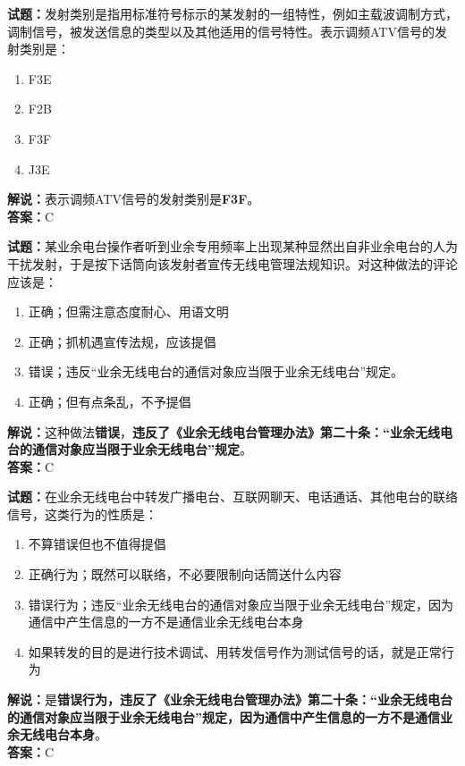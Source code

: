\documentclass{ctexbook}
\begin{document}
\vspace{\baselineskip}

\noindent\textbf{试题：}发射类别是指用标准符号标示的某发射的一组特性，例如主载波调制方式，调制信号，被发送信息的类型以及其他适用的信号特性。表示调频ATV信号的发射类别是：
\begin{enumerate}[leftmargin=3em]
  \item F3E
  \item F2B
  \item F3F
  \item J3E
\end{enumerate}
\noindent\textbf{解说：}表示调频ATV信号的发射类别是\textbf{F3F}。\\\noindent\textbf{答案：}C

\vspace{\baselineskip}

\noindent\textbf{试题：}某业余电台操作者听到业余专用频率上出现某种显然出自非业余电台的人为干扰发射，于是按下话筒向该发射者宣传无线电管理法规知识。对这种做法的评论应该是：
\begin{enumerate}[leftmargin=3em]
  \item 正确；但需注意态度耐心、用语文明
  \item 正确；抓机遇宣传法规，应该提倡
  \item 错误；违反“业余无线电台的通信对象应当限于业余无线电台”规定。
  \item 正确；但有点条乱，不予提倡
\end{enumerate}
\noindent\textbf{解说：}这种做法\textbf{错误}，\textbf{违反了《业余无线电台管理办法》第二十条：“业余无线电台的通信对象应当限于业余无线电台”规定}。\\\noindent\textbf{答案：}C

\vspace{\baselineskip}

\noindent\textbf{试题：}在业余无线电台中转发广播电台、互联网聊天、电话通话、其他电台的联络信号，这类行为的性质是：
\begin{enumerate}[leftmargin=3em]
  \item 不算错误但也不值得提倡
  \item 正确行为；既然可以联络，不必要限制向话筒送什么内容
  \item 错误行为；违反“业余无线电台的通信对象应当限于业余无线电台”规定，因为通信中产生信息的一方不是通信业余无线电台本身
  \item 如果转发的目的是进行技术调试、用转发信号作为测试信号的话，就是正常行为
\end{enumerate}
\noindent\textbf{解说：}是\textbf{错误行为，违反了《业余无线电台管理办法》第二十条：“业余无线电台的通信对象应当限于业余无线电台”规定，因为通信中产生信息的一方不是通信业余无线电台本身}。\\\noindent\textbf{答案：}C
\end{document}
